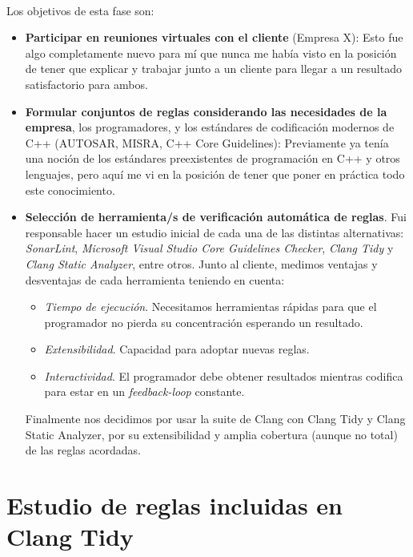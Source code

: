 \documentclass[12pt]{extreport} %
\begin{document}
\paragraph{}
Los objetivos de esta fase son:
\begin{itemize}
\item \textbf{Participar en reuniones virtuales con el cliente}
  (Empresa X): Esto fue algo completamente nuevo para mí que nunca me
  había visto en la posición de tener que explicar y trabajar junto a
  un cliente para llegar a un resultado satisfactorio para ambos.

\item \textbf{Formular conjuntos de reglas considerando las
  necesidades de la empresa}, los programadores, y los estándares de
  codificación modernos de C++ (AUTOSAR, MISRA, C++ Core Guidelines):
  Previamente ya tenía una noción de los estándares preexistentes de
  programación en C++ y otros lenguajes, pero aquí me vi en la
  posición de tener que poner en práctica todo este conocimiento.

\item \textbf{Selección de herramienta/s de verificación automática de
  reglas}. Fui responsable hacer un estudio inicial de cada una de las
  distintas alternativas: \emph{SonarLint}, \emph{Microsoft Visual
  Studio Core Guidelines Checker}, \emph{Clang Tidy} y \emph{Clang
  Static Analyzer}, entre otros. Junto al cliente, medimos ventajas y
  desventajas de cada herramienta teniendo en cuenta:
  \begin{itemize}
  \item \emph{Tiempo de ejecución}. Necesitamos herramientas rápidas
    para que el programador no pierda su concentración esperando un
    resultado.
  \item \emph{Extensibilidad}. Capacidad para adoptar nuevas reglas.
  \item \emph{Interactividad}. El programador debe obtener resultados
    mientras codifica para estar en un \emph{feedback-loop} constante.
  \end{itemize}
  Finalmente nos decidimos por usar la suite de Clang con Clang Tidy y
  Clang Static Analyzer, por su extensibilidad y amplia cobertura
  (aunque no total) de las reglas acordadas.
\end{itemize}

\section{Estudio de reglas incluidas en Clang Tidy}
\label{fase-2}
\end{document}
